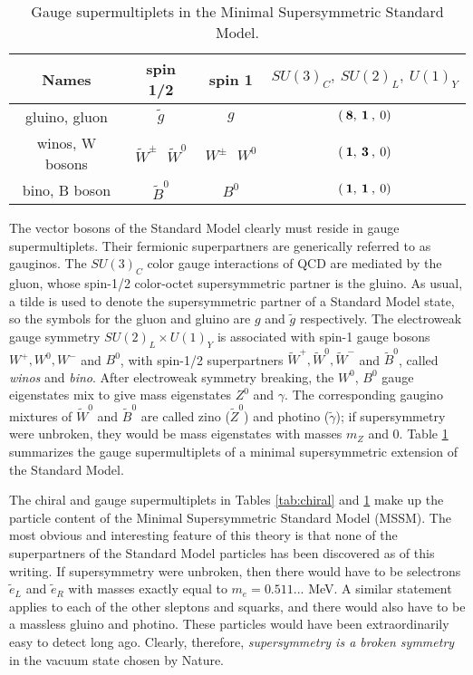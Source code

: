 \documentclass[11pt]{article}
\def\stilde{\widetilde}
\begin{document}
\renewcommand{\arraystretch}{1.55}
\begin{table}[t]
\begin{center}
\begin{tabular}{|c|c|c|c|}
\hline
Names & spin 1/2 & spin 1 & $SU(3)_C, \> SU(2)_L,\> U(1)_Y$\\
\hline\hline
gluino, gluon &$ \stilde g$& $g$ & $(\>{\bf 8},\>{\bf 1}\>,\> 0)$
\\
\hline
winos, W bosons & $ \stilde W^\pm\>\>\> \stilde W^0 $&
 $W^\pm\>\>\> W^0$ & $(\>{\bf 1},\>{\bf 3}\>,\> 0)$
\\
\hline
bino, B boson &$\stilde B^0$&
 $B^0$ & $(\>{\bf 1},\>{\bf 1}\>,\> 0)$
\\
\hline
\end{tabular}
\caption{Gauge supermultiplets in
the Minimal Supersymmetric Standard Model.\label{tab:gauge}}
\vspace{-0.45cm}
\end{center}
\end{table}
The vector bosons of the Standard Model clearly must reside in gauge
supermultiplets. Their fermionic superpartners are generically referred to
as gauginos. The $SU(3)_C$ color gauge interactions of QCD are mediated by
the gluon, whose spin-1/2 color-octet supersymmetric partner is the
gluino. As usual, a tilde is used to denote the supersymmetric partner of
a Standard Model state, so the symbols for the gluon and gluino are $g$
and $\stilde g$ respectively. The electroweak gauge symmetry
$SU(2)_L\times U(1)_Y$ is associated with spin-1 gauge bosons $W^+, W^0,
W^-$ and $B^0$, with spin-1/2 superpartners $\stilde W^+, \stilde W^0,
\stilde W^-$ and $\stilde B^0$, called {\it winos} and {\it bino}. After
electroweak symmetry breaking, the $W^0$, $B^0$ gauge eigenstates mix to
give mass eigenstates $Z^0$ and $\gamma$. The corresponding gaugino
mixtures of $\stilde W^0$ and $\stilde B^0$ are called zino ($\stilde Z^0$) 
and photino ($\stilde \gamma$); if supersymmetry were unbroken, they would
be mass eigenstates with masses $m_Z$ and 0. Table \ref{tab:gauge} 
summarizes the gauge
supermultiplets of a minimal supersymmetric extension of the Standard
Model. 

The chiral and gauge supermultiplets in Tables \ref{tab:chiral} and 
\ref{tab:gauge} make up the
particle content of the Minimal Supersymmetric Standard Model (MSSM). The
most obvious and interesting feature of this theory is that none of the
superpartners of the Standard Model particles has been discovered as of
this writing. If supersymmetry were unbroken, then there would have to be
selectrons $\stilde e_L$ and $\stilde e_R$ with masses exactly equal to
$m_e = 0.511...$ MeV. A similar statement applies to each of the other
sleptons and squarks, and there would also have to be a massless gluino
and photino. These particles would have been extraordinarily easy to
detect long ago. Clearly, therefore, {\it supersymmetry is a broken
symmetry} in the vacuum state chosen by Nature. 
\end{document}
